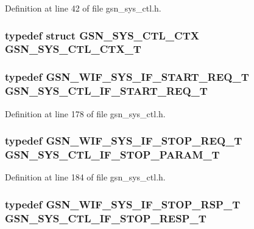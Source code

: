 Definition at line 42 of file gsn\_\-sys\_\-ctl.h.

\hypertarget{a00592_ae5427b57fe0c68bea517ad9805c3dc12}{
\subsubsection[{GSN\_\-SYS\_\-CTL\_\-CTX\_\-T}]{\setlength{\rightskip}{0pt plus 5cm}typedef struct {\bf GSN\_\-SYS\_\-CTL\_\-CTX}  {\bf GSN\_\-SYS\_\-CTL\_\-CTX\_\-T}}}
\label{a00592_ae5427b57fe0c68bea517ad9805c3dc12}
\hypertarget{a00592_a427912d3a0518a0ca30f465b0bcfc5e4}{
\subsubsection[{GSN\_\-SYS\_\-CTL\_\-IF\_\-START\_\-REQ\_\-T}]{\setlength{\rightskip}{0pt plus 5cm}typedef {\bf GSN\_\-WIF\_\-SYS\_\-IF\_\-START\_\-REQ\_\-T} {\bf GSN\_\-SYS\_\-CTL\_\-IF\_\-START\_\-REQ\_\-T}}}
\label{a00592_a427912d3a0518a0ca30f465b0bcfc5e4}


Definition at line 178 of file gsn\_\-sys\_\-ctl.h.

\hypertarget{a00592_adcf17c85777d6d4edf413488e71f24ba}{
\subsubsection[{GSN\_\-SYS\_\-CTL\_\-IF\_\-STOP\_\-PARAM\_\-T}]{\setlength{\rightskip}{0pt plus 5cm}typedef {\bf GSN\_\-WIF\_\-SYS\_\-IF\_\-STOP\_\-REQ\_\-T} {\bf GSN\_\-SYS\_\-CTL\_\-IF\_\-STOP\_\-PARAM\_\-T}}}
\label{a00592_adcf17c85777d6d4edf413488e71f24ba}


Definition at line 184 of file gsn\_\-sys\_\-ctl.h.

\hypertarget{a00592_a212275de1752c444a66d9210d799b9f1}{
\subsubsection[{GSN\_\-SYS\_\-CTL\_\-IF\_\-STOP\_\-RESP\_\-T}]{\setlength{\rightskip}{0pt plus 5cm}typedef {\bf GSN\_\-WIF\_\-SYS\_\-IF\_\-STOP\_\-RSP\_\-T} {\bf GSN\_\-SYS\_\-CTL\_\-IF\_\-STOP\_\-RESP\_\-T}}}
\label{a00592_a212275de1752c444a66d9210d799b9f1}


